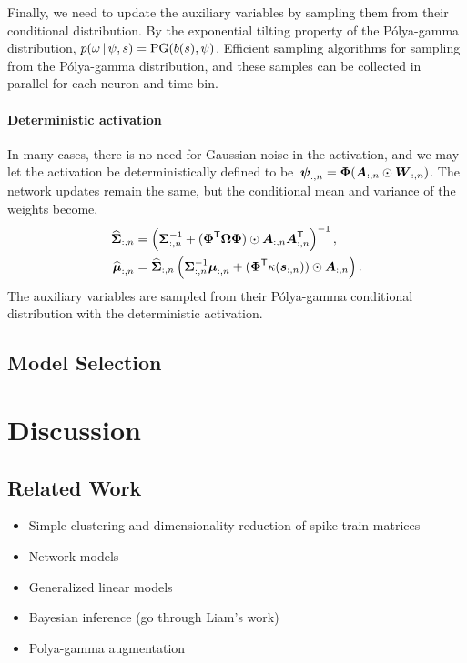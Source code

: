 Finally, we need to update the auxiliary variables by sampling them from their conditional distribution. 
By the exponential tilting property of the P\'{o}lya-gamma
distribution, ${p(\omega \,|\, \psi, s) = \mathrm{PG}(b(s), \psi)}$.
Efficient sampling algorithms for sampling from the P\'{o}lya-gamma distribution, and 
these samples can be collected in parallel for each neuron and time bin. 

\paragraph{Deterministic activation}
In many cases, there is no need for Gaussian noise in the activation, and we may let the activation be deterministically defined to be~$\boldsymbol{\psi}_{:,n} = \boldsymbol{\Phi}(\boldsymbol{A}_{:,n} \odot \boldsymbol{W}_{:,n})$. The network updates remain the same, but the conditional mean and variance of the weights become,
\begin{align}
\widehat{\boldsymbol{\Sigma}}_{:,n} &= \left( \boldsymbol{\Sigma}_{:,n}^{-1} + (\boldsymbol{\Phi}^{\mathsf{T}} \boldsymbol{\Omega} \boldsymbol{\Phi}) \odot \boldsymbol{A}_{:,n} \boldsymbol{A}_{:,n}^{\mathsf{T}} \right)^{-1}, \\
\widehat{\boldsymbol{\mu}}_{:,n} &= \widehat{\boldsymbol{\Sigma}}_{:,n}
\left( \boldsymbol{\Sigma}_{:,n}^{-1} \boldsymbol{\mu}_{:,n} + (\boldsymbol{\Phi}^{\mathsf{T}}  \kappa(\boldsymbol{s}_{:,n})) \odot \boldsymbol{A}_{:,n} \right).
\end{align}
The auxiliary variables are sampled from their P\'{o}lya-gamma conditional distribution with the deterministic activation.

\subsection{Model Selection}


\section{Discussion}

\subsection{Related Work}
\begin{itemize}
\item Simple clustering and dimensionality reduction of spike train matrices
\item Network models
\item Generalized linear models
\item Bayesian inference (go through Liam's work)
\item Polya-gamma augmentation
\end{itemize}


